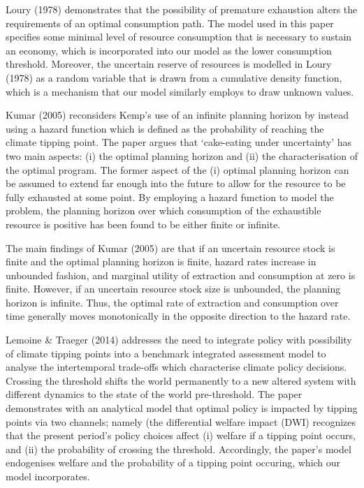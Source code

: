 \documentclass[11pt,preprint, authoryear]{elsarticle}
\numberwithin{equation}{section}
\numberwithin{figure}{section}
\numberwithin{table}{section}
\begin{document}
Loury (1978) demonstrates that the possibility of premature exhaustion
alters the requirements of an optimal consumption path. The model used
in this paper specifies some minimal level of resource consumption that
is necessary to sustain an economy, which is incorporated into our model
as the lower consumption threshold. Moreover, the uncertain reserve of
resources is modelled in Loury (1978) as a random variable that is drawn
from a cumulative density function, which is a mechanism that our model
similarly employs to draw unknown values.

Kumar (2005) reconsiders Kemp's use of an infinite planning horizon by
instead using a hazard function which is defined as the probability of
reaching the climate tipping point. The paper argues that `cake-eating
under uncertainty' has two main aspects: (i) the optimal planning
horizon and (ii) the characterisation of the optimal program. The former
aspect of the (i) optimal planning horizon can be assumed to extend far
enough into the future to allow for the resource to be fully exhausted
at some point. By employing a hazard function to model the problem, the
planning horizon over which consumption of the exhaustible resource is
positive has been found to be either finite or infinite.

The main findings of Kumar (2005) are that if an uncertain resource
stock is finite and the optimal planning horizon is finite, hazard rates
increase in unbounded fashion, and marginal utility of extraction and
consumption at zero is finite. However, if an uncertain resource stock
size is unbounded, the planning horizon is infinite. Thus, the optimal
rate of extraction and consumption over time generally moves
monotonically in the opposite direction to the hazard rate.

Lemoine \& Traeger (2014) addresses the need to integrate policy with
possibility of climate tipping points into a benchmark integrated
assessment model to analyse the intertemporal trade-offs which
characterise climate policy decisions. Crossing the threshold shifts the
world permanently to a new altered system with different dynamics to the
state of the world pre-threshold. The paper demonstrates with an
analytical model that optimal policy is impacted by tipping points via
two channels; namely (the differential welfare impact (DWI) recognizes
that the present period's policy choices affect (i) welfare if a tipping
point occurs, and (ii) the probability of crossing the threshold.
Accordingly, the paper's model endogenises welfare and the probability
of a tipping point occuring, which our model incorporates.
\end{document}
